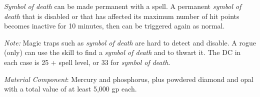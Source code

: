 {	\emph{Symbol of death} can be made permanent with a  spell. A permanent \emph{symbol of death} that is disabled or that has affected its maximum number of hit points becomes inactive for 10 minutes, then can be triggered again as normal.

	\textit{Note:}
	Magic traps such as \emph{symbol of death} are hard to detect and disable. A rogue (only) can use the  skill to find a \emph{symbol of death} and  to thwart it. The DC in each case is 25 + spell level, or 33 for \emph{symbol of death}.

	\textit{Material Component}:
	Mercury and phosphorus, plus powdered diamond and opal with a total value of at least 5,000 gp each.

}
